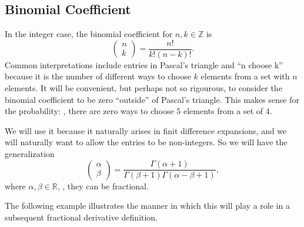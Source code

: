 \subsection{Binomial Coefficient}
In the integer case, the binomial coefficient for $n,k \in \mathbb Z$ is
\begin{equation}
  \left( \begin{array}{c} n \\ k \end{array} \right) = \frac{n!}{k!\left(n-k\right)!}.
  \label{eq:binomialint}
\end{equation}
Common interpretations include entries in Pascal's triangle and ``n choose k'' because it is the number of different ways to choose $k$ elements from a set with $n$ elements. It will be convenient, but perhaps not so rigourous, to consider the binomial coefficient to be zero ``outside'' of Pascal's triangle. This makes sense for the probability: \eg, there are zero ways to choose $5$ elements from a set of $4$.

We will use it because it naturally arises in finit difference expansions, and we will naturally want to allow the entries to be non-integers. So we will have the generalization
\begin{equation}
  \left( \begin{array}{c} \alpha \\ \beta \end{array} \right) = \frac{\Gamma\left(\alpha+1\right)}{\Gamma\left(\beta + 1 \right) \Gamma \left(\alpha - \beta + 1\right)},
  \label{eq:binomialfrac}
\end{equation}
where $\alpha, \beta \in \mathbb R$, \ie, they can be fractional.

The following example illustrates the manner in which this will play a role in a subsequent fractional derivative definition.

